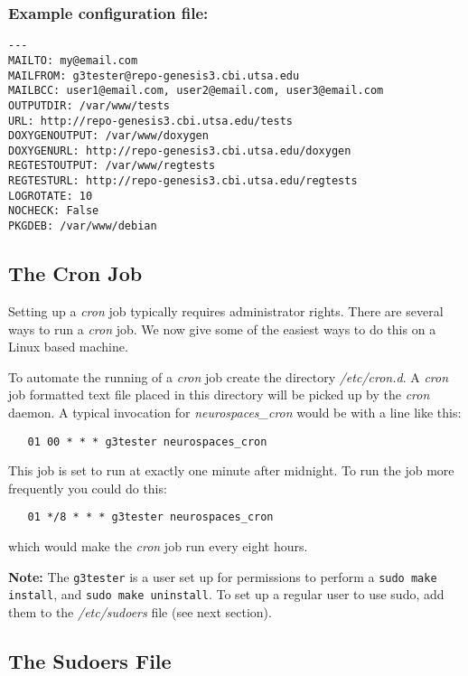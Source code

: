 \documentclass[12pt]{article}
\begin{document}
\subsubsection*{Example configuration file:}

\begin{verbatim}
---
MAILTO: my@email.com
MAILFROM: g3tester@repo-genesis3.cbi.utsa.edu
MAILBCC: user1@email.com, user2@email.com, user3@email.com
OUTPUTDIR: /var/www/tests
URL: http://repo-genesis3.cbi.utsa.edu/tests
DOXYGENOUTPUT: /var/www/doxygen
DOXYGENURL: http://repo-genesis3.cbi.utsa.edu/doxygen
REGTESTOUTPUT: /var/www/regtests
REGTESTURL: http://repo-genesis3.cbi.utsa.edu/regtests
LOGROTATE: 10
NOCHECK: False
PKGDEB: /var/www/debian

\end{verbatim}

\subsection*{The Cron Job}

Setting up a {\it cron} job typically requires administrator rights. There are several ways to run a {\it cron} job. We now give some of the easiest ways to do this on a Linux based machine.

To automate the running of a {\it cron} job create the directory {\it /etc/cron.d}. A {\it cron} job formatted text file placed in this directory will be picked up by the {\it cron} daemon. A typical invocation for {\it neurospaces\_cron} would be with a line like this:
\begin{verbatim}
   01 00 * * * g3tester neurospaces_cron
\end{verbatim}
This job is set to run at exactly one minute after midnight. To run the job more frequently you could do this:
\begin{verbatim}
   01 */8 * * * g3tester neurospaces_cron
\end{verbatim}
which would make the {\it cron} job run every eight hours.

{\bf Note:} The {\tt g3tester} is a user set up for permissions to perform a {\tt sudo make install}, and {\tt sudo make uninstall}. To set up a regular user to use sudo, add them to the {\it /etc/sudoers} file (see next section).

\subsection*{The Sudoers File}
\end{document}
